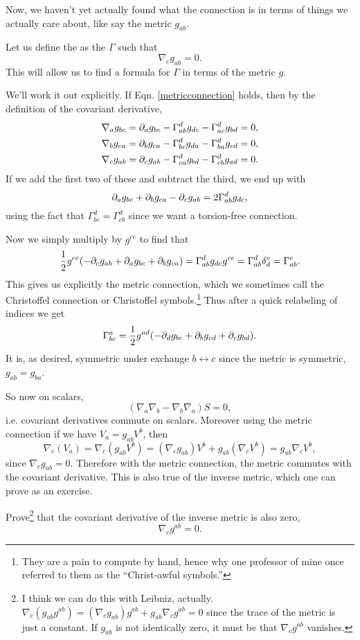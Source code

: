 Now, we haven't yet actually found what the connection is in terms of things we actually care about, like say the metric $g_{ab}.$
\begin{defn}
Let us define the  as the $\Gamma$ such that
\begin{equation}\label{metricconnection}
\nabla_c g_{ab}=0.
\end{equation}
This will allow us to find a formula for $\Gamma$ in terms of the metric $g$.
\end{defn}

We'll work it out explicitly. If Eqn. \ref{metricconnection} holds, then by the definition of the covariant derivative,
\begin{align*}
\nabla_a g_{bc}&=\partial_a g_{bc}-\Gamma^d_{ab}g_{dc}-\Gamma^d_{ac}g_{bd}=0,\\
\nabla_b g_{ca}&=\partial_b g_{ca}-\Gamma^d_{bc} g_{da} - \Gamma^d_{ba}g_{cd}=0,\\
\nabla_c g_{ab}&=\partial_c g_{ab}-\Gamma^d_{ca} g_{bd}-\Gamma^d_{cb}g_{ad}=0.
\end{align*}
If we add the first two of these and subtract the third, we end up with
$$\partial_a g_{bc}+\partial_b g_{ca} - \partial_c g_{ab} = 2\Gamma^d_{ab} g_{dc},$$
using the fact that $\Gamma^d_{bc}=\Gamma^d_{cb}$ since we want a torsion-free connection.

Now we simply multiply by $g^{ce}$ to find that
$$\frac{1}{2}g^{ce}(-\partial_c g_{ab} +\partial_a g_{bc} +\partial_b g_{ca})=\Gamma^d_{ab} g_{dc} g^{ce} =\Gamma^d_{ab} \delta^e_d = \Gamma^e_{ab}.$$
This gives us explicitly the metric connection, which we sometimes call the Christoffel connection or Christoffel symbols.\footnote{They are a pain to compute by hand, hence why one professor of mine once referred to them as the ``Christ-awful symbols.''} Thus after a quick relabeling of indices we get
\begin{equation}
    \Gamma^a_{bc}=\frac{1}{2} g^{ad}(-\partial_d g_{bc}+\partial_b g_{cd} + \partial_c g_{bd}).
\end{equation}
It is, as desired, symmetric under exchange $b\leftrightarrow c$ since the metric is symmetric, $g_{ab}=g_{ba}$.

So now on scalars,
$$(\nabla_a \nabla_b -\nabla_b \nabla_a)S=0,$$
i.e. covariant derivatives commute on scalars. Moreover using the metric connection if we have $V_a =g_{ab} V^b$, then
$$\nabla_c(V_a)=\nabla_c (g_{ab} V^b)=(\nabla_c g_{ab}) V^b+ g_{ab}(\nabla_c V^b)= g_{ab}\nabla_c V^b,$$
since $\nabla_c g_{ab}=0$. Therefore with the metric connection, the metric commutes with the covariant derivative. This is also true of the inverse metric, which one can prove as an exercise.

\begin{ex}
Prove\footnote{I think we can do this with Leibniz, actually. $\nabla_c(g_{ab}g^{ab})=(\nabla_c g_{ab}) g^{ab}+g_{ab} \nabla_c g^{ab} = 0$ since the trace of the metric is just a constant. If $g_{ab}$ is not identically zero, it must be that $\nabla_c g^{ab}$ vanishes.} that the covariant derivative of the inverse metric is also zero,
$$\nabla_c g^{ab}=0.$$
\end{ex}